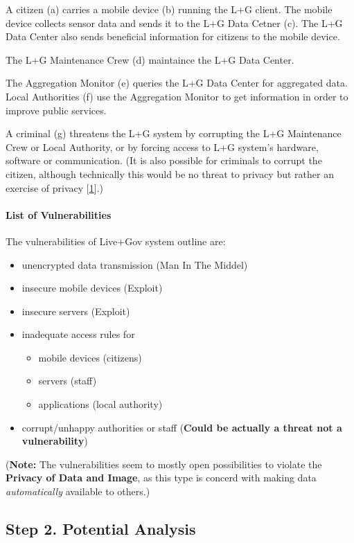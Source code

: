 A citizen (a) carries a mobile device (b) running the L+G client. The
mobile device collects sensor data and sends it to the L+G Data Cetner
(c). The L+G Data Center also sends beneficial information for citizens
to the mobile device.

The L+G Maintenance Crew (d) maintaince the L+G Data Center.

The Aggregation Monitor (e) queries the L+G Data Center for aggregated
data. Local Authorities (f) use the Aggregation Monitor to get
information in order to improve public services.

A criminal (g) threatens the L+G system by corrupting the L+G
Maintenance Crew or Local Authority, or by forcing access to L+G
system's hardware, software or communication. (It is also possible for
criminals to corrupt the citizen, although technically this would be no
threat to privacy but rather an exercise of privacy
{[}\hyperref[references]{1}{]}.)

\paragraph{List of Vulnerabilities}

The vulnerabilities of Live+Gov system outline are:

\begin{itemize}
\item
  unencrypted data transmission (Man In The Middel)
\item
  insecure mobile devices (Exploit)
\item
  insecure servers (Exploit)
\item
  inadequate access rules for
  \begin{itemize}
  \item
    mobile devices (citizens)
  \item
    servers (staff)
  \item
    applications (local authority)
  \end{itemize}
\item
  corrupt/unhappy authorities or staff (\textbf{Could be actually a
  threat not a vulnerability})
\end{itemize}

(\textbf{Note:} The vulnerabilities seem to mostly open possibilities to
violate the \textbf{Privacy of Data and Image}, as this type is concerd
with making data \emph{automatically} available to others.)

\subsection{Step 2. Potential Analysis}

